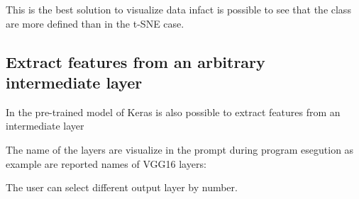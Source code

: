 \documentclass[12pt]{article} %
\begin{document}
This is the best solution to visualize data infact is possible to see that the class are more defined than in the t-SNE case.

\subsection {Extract features from an arbitrary intermediate layer}
In the pre-trained model of Keras is also possible to extract features from an intermediate layer

\begin{figure}[H] %
\end{figure}

The name of the layers are visualize in the prompt during program esegution as example are reported names of VGG16 layers:

\begin{figure}[H] %
\end{figure}

The user can select different output layer by number.

\begin{figure}[H] %
\end{figure}
\end{document}
